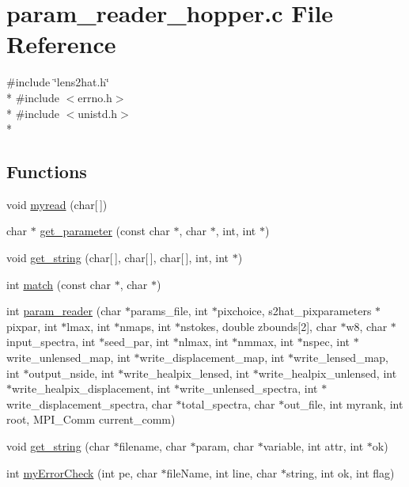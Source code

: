 \section{param\-\_\-reader\-\_\-hopper.\-c File Reference}
\label{src_2common_2param__reader__hopper_8c}
{\ttfamily \#include \char`\"{}lens2hat.\-h\char`\"{}}\\*
{\ttfamily \#include $<$errno.\-h$>$}\\*
{\ttfamily \#include $<$unistd.\-h$>$}\\*
\subsection*{Functions}
\begin{DoxyCompactItemize}
\item 
void \hyperlink{src_2common_2param__reader__hopper_8c_a50c0568f618886d78986c4a9d6a23ba4}{myread} (char\mbox{[}$\,$\mbox{]})
\item 
char $\ast$ \hyperlink{src_2common_2param__reader__hopper_8c_ab3cc75c29a38da58b8a99b6f65096891}{get\-\_\-parameter} (const char $\ast$, char $\ast$, int, int $\ast$)
\item 
void \hyperlink{src_2common_2param__reader__hopper_8c_acdf8e6c6f50db79679922d3dbf74dd84}{get\-\_\-string} (char\mbox{[}$\,$\mbox{]}, char\mbox{[}$\,$\mbox{]}, char\mbox{[}$\,$\mbox{]}, int, int $\ast$)
\item 
int \hyperlink{src_2common_2param__reader__hopper_8c_af71971b64e93dd85136d531400035e57}{match} (const char $\ast$, char $\ast$)
\item 
int \hyperlink{src_2common_2param__reader__hopper_8c_ab6bacb8b57a4a9612bd4d7a8ec68dfb9}{param\-\_\-reader} (char $\ast$params\-\_\-file, int $\ast$pixchoice, s2hat\-\_\-pixparameters $\ast$pixpar, int $\ast$lmax, int $\ast$nmaps, int $\ast$nstokes, double zbounds\mbox{[}2\mbox{]}, char $\ast$w8, char $\ast$input\-\_\-spectra, int $\ast$seed\-\_\-par, int $\ast$nlmax, int $\ast$nmmax, int $\ast$nspec, int $\ast$write\-\_\-unlensed\-\_\-map, int $\ast$write\-\_\-displacement\-\_\-map, int $\ast$write\-\_\-lensed\-\_\-map, int $\ast$output\-\_\-nside, int $\ast$write\-\_\-healpix\-\_\-lensed, int $\ast$write\-\_\-healpix\-\_\-unlensed, int $\ast$write\-\_\-healpix\-\_\-displacement, int $\ast$write\-\_\-unlensed\-\_\-spectra, int $\ast$write\-\_\-displacement\-\_\-spectra, char $\ast$total\-\_\-spectra, char $\ast$out\-\_\-file, int myrank, int root, M\-P\-I\-\_\-\-Comm current\-\_\-comm)
\item 
void \hyperlink{src_2common_2param__reader__hopper_8c_a1be51b19c79f5c49c6ce2128259fc093}{get\-\_\-string} (char $\ast$filename, char $\ast$param, char $\ast$variable, int attr, int $\ast$ok)
\item 
int \hyperlink{src_2common_2param__reader__hopper_8c_a70bcbd531a6e4abc62d73f5b4532c2cc}{my\-Error\-Check} (int pe, char $\ast$file\-Name, int line, char $\ast$string, int ok, int flag)
\end{DoxyCompactItemize}


